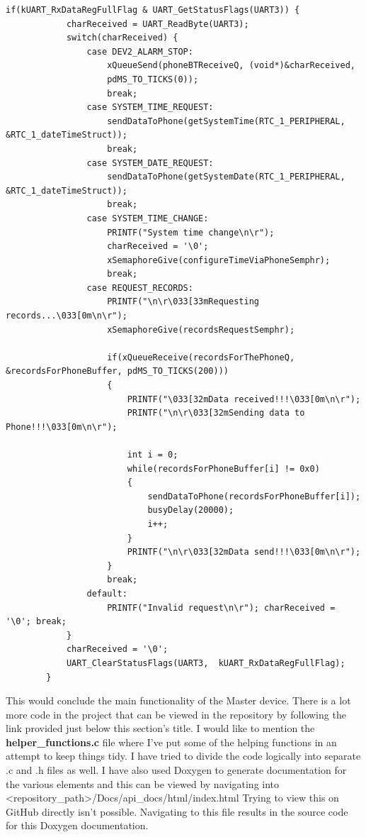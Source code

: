 \documentclass[12pt,a4paper]{article}
\begin{document}
        \begin{lstlisting}[label={lst:phoneBTTaskSwitch}, caption=Phone request resolution]
        if(kUART_RxDataRegFullFlag & UART_GetStatusFlags(UART3)) {
            charReceived = UART_ReadByte(UART3);
            switch(charReceived) {
                case DEV2_ALARM_STOP: 		
                    xQueueSend(phoneBTReceiveQ, (void*)&charReceived,
                    pdMS_TO_TICKS(0)); 
                    break;
                case SYSTEM_TIME_REQUEST: 	
                    sendDataToPhone(getSystemTime(RTC_1_PERIPHERAL, &RTC_1_dateTimeStruct));
                    break;
                case SYSTEM_DATE_REQUEST: 	
                    sendDataToPhone(getSystemDate(RTC_1_PERIPHERAL, &RTC_1_dateTimeStruct));
                    break;
                case SYSTEM_TIME_CHANGE:	
                    PRINTF("System time change\n\r");
                    charReceived = '\0';
                    xSemaphoreGive(configureTimeViaPhoneSemphr);
                    break;
                case REQUEST_RECORDS:		
                    PRINTF("\n\r\033[33mRequesting records...\033[0m\n\r");
                    xSemaphoreGive(recordsRequestSemphr);

                    if(xQueueReceive(recordsForThePhoneQ, &recordsForPhoneBuffer, pdMS_TO_TICKS(200)))
                    {
                        PRINTF("\033[32mData received!!!\033[0m\n\r");
                        PRINTF("\n\r\033[32mSending data to Phone!!!\033[0m\n\r");

                        int i = 0;
                        while(recordsForPhoneBuffer[i] != 0x0)
                        {
                            sendDataToPhone(recordsForPhoneBuffer[i]);
                            busyDelay(20000);
                            i++;
                        }
                        PRINTF("\n\r\033[32mData send!!!\033[0m\n\r");
                    }
                    break;
                default:					
                    PRINTF("Invalid request\n\r"); charReceived = '\0'; break;
            } 
            charReceived = '\0';
            UART_ClearStatusFlags(UART3,  kUART_RxDataRegFullFlag);
        } 
        \end{lstlisting}
        
    This would conclude the main functionality of the Master device. There is a lot more code in the project that can be viewed in the repository by following the link provided just below this section's title. I would like to mention the {\bfseries helper\_functions.c} file where I've put some of the helping functions in an attempt to keep things tidy. I have tried to divide the code logically into separate .c and .h files as well. I have also used Doxygen to generate documentation for the various elements and this can be viewed by navigating into <repository\_path>/Docs/api\_docs/html/index.html Trying to view this on GitHub directly isn't possible. Navigating to this file results in the source code for this Doxygen documentation. 
    \newpage
    
\end{document}
